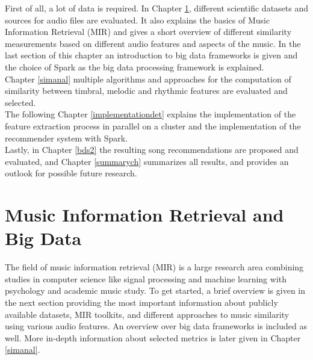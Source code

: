 \begin{figure}[htbp]
	\centering
	\label{structh}
\end{figure}

\noindent First of all, a lot of data is required. In Chapter \ref{audiofeat}, different scientific datasets and sources for audio files are evaluated. It also explains the basics of Music Information Retrieval (MIR) and gives a short overview of different similarity measurements based on different audio features and aspects of the music. In the last section of this chapter an introduction to big data frameworks is given and the choice of Spark as the big data processing framework is explained.\\
Chapter \ref{simanal} multiple algorithms and approaches for the computation of similarity between timbral, melodic and rhythmic features are evaluated and selected.\\
The following Chapter \ref{implementationdet} explains the implementation of the feature extraction process in parallel on a cluster and the implementation of the recommender system with Spark.\\
Lastly, in Chapter \ref{bds2} the resulting song recommendations are proposed and evaluated, and Chapter \ref{summarych} summarizes all results, and provides an outlook for possible future research. 








\chapter{Music Information Retrieval and Big Data}\label{audiofeat}

The field of music information retrieval (MIR) is a large research area combining studies in computer science like signal processing and machine learning with psychology and academic music study. To get started, a brief overview is given in the next section providing the most important information about publicly available datasets, MIR toolkits, and different approaches to music similarity using various audio features. An overview over big data frameworks is included as well. More in-depth information about selected metrics is later given in Chapter \ref{simanal}. 

